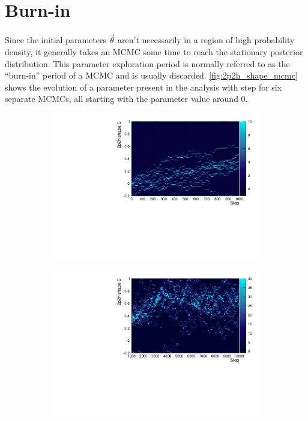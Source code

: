 \section{Burn-in}
Since the initial parameters $\vec{\theta}$ aren't necessarily in a region of high probability density, it generally takes an MCMC some time to reach the stationary posterior distribution. This parameter exploration period is normally referred to as the ``burn-in'' period of a MCMC and is usually discarded. \autoref{fig:2p2h_shape_mcmc} shows the evolution of a parameter present in the analysis with step for six separate MCMCs, all starting with the parameter value around 0. 
\begin{figure}[h]
	\begin{subfigure}[t]{0.40\textwidth}
		\includegraphics[width=\textwidth, trim={0mm 0mm 0mm 0mm}, clip,page=1]{figures/mcmc/2p2h_shape_C_step}
	\end{subfigure}
	\begin{subfigure}[t]{0.40\textwidth}
		\includegraphics[width=\textwidth, trim={0mm 0mm 0mm 0mm}, clip,page=1]{figures/mcmc/2p2h_shape_C_step2}
	\end{subfigure}
	

\end{figure}
